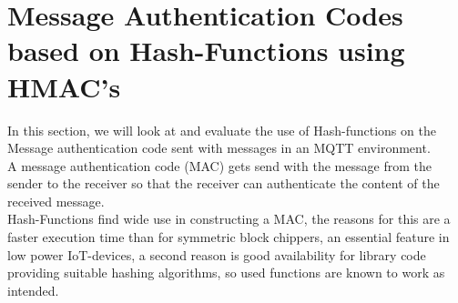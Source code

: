 \section{Message Authentication Codes based on Hash-Functions using HMAC's}

In this section, we will look at and evaluate the use of Hash-functions on the Message authentication code sent with messages in an MQTT environment. \\
A message authentication code (MAC) gets send with the message from the sender to the receiver so that the receiver can authenticate the content of the received message. \\
Hash-Functions find wide use in constructing a MAC, the reasons for this are a faster execution time than for symmetric block chippers, an essential feature in low power IoT-devices, a second reason is good availability for library code providing suitable hashing algorithms, so used functions are known to work as intended. 
